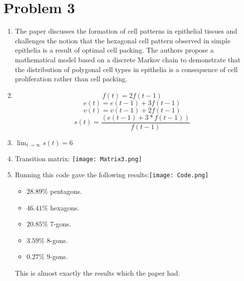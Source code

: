 \documentclass{article}
\begin{document}
\section*{Problem 3}
\begin{enumerate}[label=(\alph*)]
    \item The paper discusses the formation of cell patterns in epithelial tissues and challenges the notion that the hexagonal cell pattern observed in simple epithelia is a result of optimal cell packing. The authors propose a mathematical model based on a discrete Markov chain to demonstrate that the distribution of polygonal cell types in epithelia is a consequence of cell proliferation rather than cell packing.
    \item $$f(t)=2f(t-1)$$ $$e(t)=e(t-1)+3f(t-1)$$ $$v(t)=v(t-1)+2f(t-1)$$ $$s(t) = \frac{(e(t-1) + 3 * f(t-1))}{f(t-1)}$$
    \item $\lim_{t\to \infty}{s(t)}=6$
    \item Transition matrix: \newline\texttt{[image: Matrix3.png]}
    \item Running this code gave the following results:\newline\texttt{[image: Code.png]}\begin{itemize}
        \item $28.89\%$ pentagons.
        \item $46.41\%$ hexagons.
        \item $20.85\%$ 7-gons.
        \item $3.59\%$ 8-gons.
        \item $0.27\%$ 9-gons.
    \end{itemize} This is almost exactly the results which the paper had.
\end{enumerate}
\end{document}
